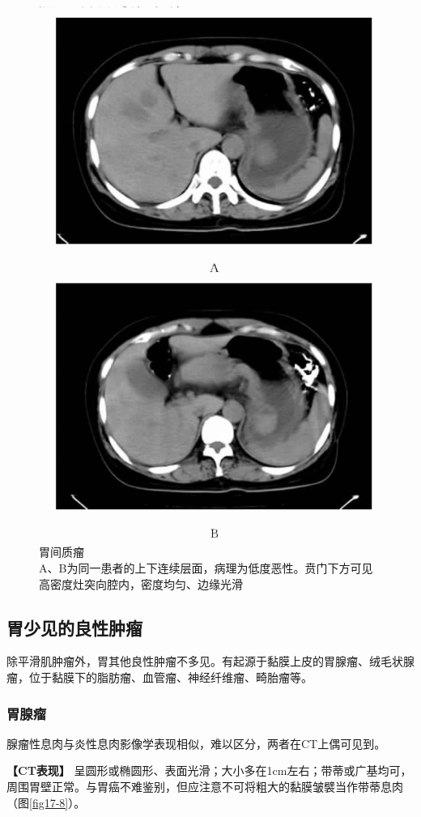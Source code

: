 \begin{figure}[!htbp]
 \centering
 \includegraphics[width=.7\textwidth,height=\textheight,keepaspectratio]{./images/Image00358.jpg}
 \captionsetup{justification=centering}
 \caption{胃间质瘤\\{\small A、B为同一患者的上下连续层面，病理为低度恶性。贲门下方可见高密度灶突向腔内，密度均匀、边缘光滑}}
 \label{fig17-7}
  \end{figure} 

\subsection{胃少见的良性肿瘤}

除平滑肌肿瘤外，胃其他良性肿瘤不多见。有起源于黏膜上皮的胃腺瘤、绒毛状腺瘤，位于黏膜下的脂肪瘤、血管瘤、神经纤维瘤、畸胎瘤等。

\subsubsection{胃腺瘤}

腺瘤性息肉与炎性息肉影像学表现相似，难以区分，两者在CT上偶可见到。

\textbf{【CT表现】}
呈圆形或椭圆形、表面光滑；大小多在1cm左右；带蒂或广基均可，周围胃壁正常。与胃癌不难鉴别，但应注意不可将粗大的黏膜皱襞当作带蒂息肉（图\ref{fig17-8}）。

